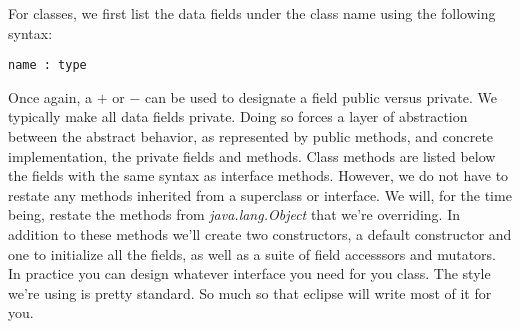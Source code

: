 \documentclass[nobib]{tufte-handout}
\begin{document}
For classes, we first list the data fields under the class name using the following syntax:
\begin{verbatim}
name : type
\end{verbatim}
Once again, a $+$ or $-$ can be used to designate a field public versus private. We typically make all data fields private. Doing so forces a layer of abstraction between the abstract behavior, as represented by public methods, and concrete implementation, the private fields and methods. Class methods are listed below the fields with the same syntax as interface methods. However, we do not have to restate any methods inherited from a superclass or interface. We will, for the time being, restate the methods from \textit{java.lang.Object} that we're overriding. In addition to these methods we'll create two constructors, a default constructor and one to initialize all the fields, as well as a suite of field accesssors and mutators. In practice you can design whatever interface you need for you class.  The style we're using is pretty standard. So much so that eclipse will write most of it for you.
\end{document}
